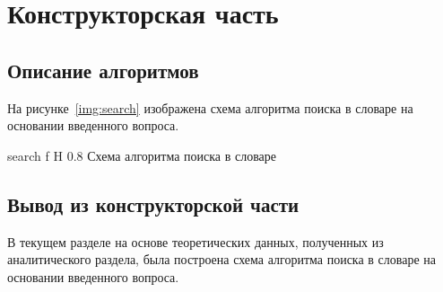 \chapter{Конструкторская часть}

\section*{Описание алгоритмов}

На рисунке~\ref{img:search} изображена схема алгоритма поиска в словаре на основании введенного вопроса.

    {search}
    {f}
    {H}
    {0.8\textwidth}
    {Схема алгоритма поиска в словаре}

\section*{Вывод из конструкторской части}

В текущем разделе на основе теоретических данных, полученных из аналитического раздела, была построена схема алгоритма поиска в словаре на основании введенного вопроса.

